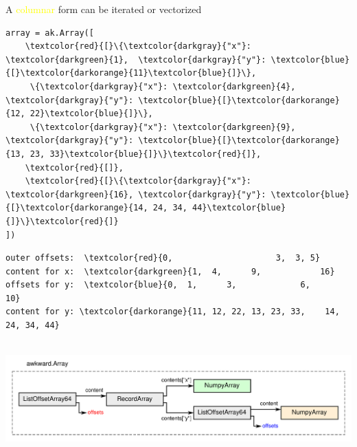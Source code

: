 \documentclass[aspectratio=169]{beamer}
\begin{document}
\begin{frame}[fragile]{A \textcolor{yellow}{columnar} form can be iterated or vectorized}
\small

\begin{Verbatim}[commandchars=\\\{\}]
array = ak.Array([
    \textcolor{red}{[}\{\textcolor{darkgray}{"x"}: \textcolor{darkgreen}{1},  \textcolor{darkgray}{"y"}: \textcolor{blue}{[}\textcolor{darkorange}{11}\textcolor{blue}{]}\},
     \{\textcolor{darkgray}{"x"}: \textcolor{darkgreen}{4},  \textcolor{darkgray}{"y"}: \textcolor{blue}{[}\textcolor{darkorange}{12, 22}\textcolor{blue}{]}\},
     \{\textcolor{darkgray}{"x"}: \textcolor{darkgreen}{9},  \textcolor{darkgray}{"y"}: \textcolor{blue}{[}\textcolor{darkorange}{13, 23, 33}\textcolor{blue}{]}\}\textcolor{red}{]},
    \textcolor{red}{[]},
    \textcolor{red}{[}\{\textcolor{darkgray}{"x"}: \textcolor{darkgreen}{16}, \textcolor{darkgray}{"y"}: \textcolor{blue}{[}\textcolor{darkorange}{14, 24, 34, 44}\textcolor{blue}{]}\}\textcolor{red}{]}
])
\end{Verbatim}

\begin{Verbatim}[commandchars=\\\{\}]
outer offsets:  \textcolor{red}{0,                     3,  3, 5}
content for x:  \textcolor{darkgreen}{1,  4,      9,            16}
offsets for y:  \textcolor{blue}{0,  1,      3,             6,            10}
content for y: \textcolor{darkorange}{11, 12, 22, 13, 23, 33,    14, 24, 34, 44}
\end{Verbatim}

\mbox{ } \hfill \includegraphics[width=0.9\linewidth]{img/example-hierarchy.pdf} \hfill \mbox{ }
\end{frame}
\end{document}

